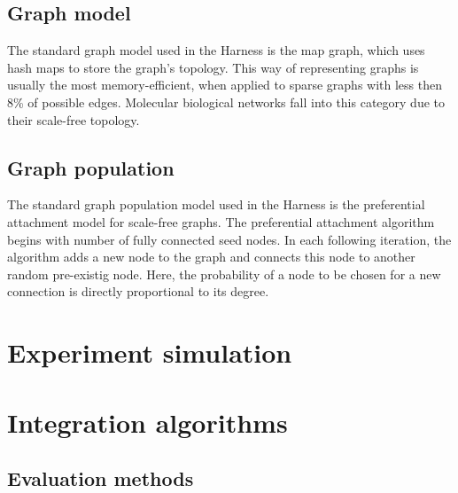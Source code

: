\documentclass{scrartcl}
\begin{document}
\subsection{Graph model}
\label{graph model}
The standard graph model used in the Harness is the map graph, which uses hash maps to store the graph's topology. This way of representing graphs is usually the most memory-efficient, when applied to sparse graphs with less then 8\% of possible edges. Molecular biological networks fall into this category due to their scale-free topology.


\subsection{Graph population}
\label{graph population}

The standard graph population model used in the Harness is the preferential attachment model for scale-free graphs. The preferential attachment algorithm begins with number of fully connected seed nodes. In each following iteration, the algorithm adds a new node to the graph and connects this node to another random pre-existig node. Here, the probability of a node to be chosen for a new connection is directly proportional to its degree.


\fbox{\parbox{\textwidth}{\scriptsize }}

\section{Experiment simulation}


\section{Integration algorithms}

\subsection{Evaluation methods}
\end{document}
